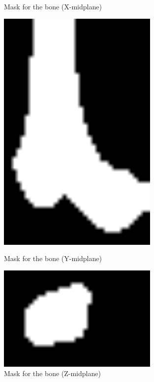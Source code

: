 \documentclass[a4paper,12pt]{article}
\begin{document}
\begin{figure}[htbp]
\begin{minipage}[b]{0.3\textwidth}
            \caption{Mask for the bone (X-midplane)}
            \label{fig:scale_mask-XM}
        \end{minipage}
        \hfill
        \begin{minipage}[b]{0.3\textwidth}
            \includegraphics[width=0.7\textwidth]{scale_mask-YM}
            \caption{Mask for the bone (Y-midplane)}
            \label{fig:scale_mask-YM}
        \end{minipage}
        \hfill
        \begin{minipage}[b]{0.3\textwidth}
            \includegraphics[width=0.7\textwidth]{scale_mask-ZM}
            \caption{Mask for the bone (Z-midplane)}
            \label{fig:scale_mask-ZM}
        \end{minipage}
    \end{figure}
\end{document}
